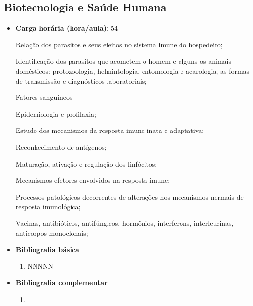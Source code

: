 \documentclass[11pt,fleqn]{book} %
\newcommand{\VER}[1]{\begingroup\color{red}#1\endgroup}
\begin{document}
\subsection{Biotecnologia e Saúde Humana}\label{disc:biotecSaude}
\begin{itemize}
	\item \textbf{Carga horária (hora/aula):} 54
	
	Relação dos parasitos e seus efeitos no sistema imune do hospedeiro; 
	
	Identificação dos parasitos que acometem o homem e alguns os animais domésticos: protozoologia, helmintologia, entomologia e acarologia, as formas de transmissão e diagnósticos laboratoriais; 
	
	\VER{Fatores sanguíneos}
	
	Epidemiologia e profilaxia; 
	
	Estudo dos mecanismos da resposta imune inata e adaptativa; 
	
	Reconhecimento de antígenos; 
	
	Maturação, ativação e regulação dos linfócitos;
	
	Mecanismos efetores envolvidos na resposta imune;
	
	Processos patológicos decorrentes de alterações nos mecanismos normais de resposta imunológica;
	
	\VER{Vacinas, antibióticos, antifúngicos, hormônios, interferons, interleucinas, anticorpos monoclonais;}
	
	\item \textbf{Bibliografia básica}
	\begin{enumerate}
		\item NNNNN
	\end{enumerate}
	\item \textbf{Bibliografia complementar}
	\begin{enumerate}
		\item 
	\end{enumerate}	
\end{itemize}


\newpage
\end{document}

